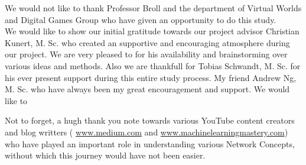 \documentclass[
11pt, %
english, %
singlespacing, %
headsepline, %
]{mediaproject} %
\begin{document}

\begin{acknowledgements}
\addchaptertocentry{\acknowledgementname} %
We would not like to thank Professor Broll and the department of Virtual Worlds and Digital Games Group who have given an opportunity to do this study.\\

We would like to show our initial gratitude towards our project advisor Christian Kunert, M. Sc. who created an supportive and encouraging atmosphere during our project. We are very pleased to for his availability and brainstorming over various ideas and methods. Also we are thankfull for Tobias Schwandt, M. Sc. for his ever present support during this entire study process. My friend Andrew Ng, M. Sc. who have always been my great encouragement and support. We would like to  

Not to forget, a hugh thank you note towards various YouTube content creators and blog writters ( \url{www.medium.com} and \url{www.machinelearningmastery.com}) who have played an important role in understanding various Network Concepts, without which this journey would have not been easier. 


\end{acknowledgements}


\tableofcontents %

\listoffigures %

\listoftables %


%
%
\end{document}

